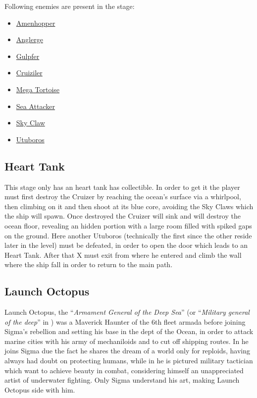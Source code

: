 Following enemies are present in the stage\cite{wiki:Ocean}:
\begin{itemize}
	\item \hyperlink{enem:Amenhopper}{Amenhopper}
	\item \hyperlink{miniboss:Anglerge}{Anglerge}
	\item \hyperlink{enem:Gulpfer}{Gulpfer }
	\item \hyperlink{enem:Cruiziler}{Cruiziler}
	\item \hyperlink{enem:Mega_Tortoise}{Mega Tortoise }
	\item \hyperlink{enem:Sea_Attacker}{Sea Attacker}
	\item \hyperlink{enem:Sky_Claw}{Sky Claw }
	\item \hyperlink{miniboss:Utuboros}{Utuboros }
\end{itemize}
\subsection{Heart Tank}
This stage only has an heart tank has collectible. In order to get it the player must first destroy the Cruizer by reaching the ocean's surface via a whirlpool, then climbing on it and then shoot at its blue core, avoiding the Sky Claws which the ship will spawn. Once destroyed the Cruizer will sink and will destroy the ocean floor, revealing an hidden portion with a large room filled with spiked gaps on the ground. Here another Utuboros (technically the first since the other reside later in the level) must be defeated, in order to open the door which leads to an Heart Tank. After that X must exit from where he entered and climb the wall where the ship fall in order to return to the main path.
\subsection{Launch Octopus}
Launch Octopus, the ``\textit{Armament General of the Deep Sea}''\cite{wayback:X_resources} (or ``\textit{Military general of the deep}''\cite{MHX:manual} in \mhx) was a Maverick Haunter of the 6th fleet armada before joining Sigma's rebellion and setting his base in the dept of the Ocean, in order to attack marine cities with his army of mechaniloids and to cut off shipping routes. In \x he joins Sigma due the fact he shares the dream of a world only for reploids, having always had doubt on protecting humans, while in \mhx he is pictured military tactician which want to achieve beauty in combat, considering himself an unappreciated artist of underwater fighting. Only Sigma understand his art, making Launch Octopus side with him\cite{wiki:MM_MHX_script}.

